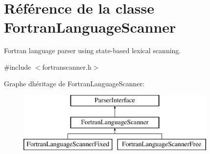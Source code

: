\hypertarget{class_fortran_language_scanner}{}\section{Référence de la classe Fortran\+Language\+Scanner}
\label{class_fortran_language_scanner}


Fortran language parser using state-\/based lexical scanning.  




{\ttfamily \#include $<$fortranscanner.\+h$>$}

Graphe d\textquotesingle{}héritage de Fortran\+Language\+Scanner\+:\begin{figure}[H]
\begin{center}
\leavevmode
\includegraphics[height=3.000000cm]{class_fortran_language_scanner}
\end{center}
\end{figure}

